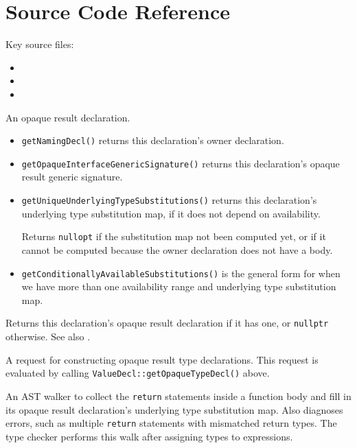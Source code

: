 \documentclass[../generics]{subfiles}
\begin{document}
\section{Source Code Reference}

Key source files:
\begin{itemize}
\item {}
\item {}
\item {}
\end{itemize}

An opaque result declaration.
\begin{itemize}
\item \texttt{getNamingDecl()} returns this declaration's owner declaration.
\item \texttt{getOpaqueInterfaceGenericSignature()} returns this declaration's opaque result generic signature.
\item \texttt{getUniqueUnderlyingTypeSubstitutions()} returns this declaration's underlying type substitution map, if it does not depend on availability.

Returns \texttt{nullopt} if the substitution map not been computed yet, or if it cannot be computed because the owner declaration does not have a body.
\item \texttt{getConditionallyAvailableSubstitutions()} is the general form for when we have more than one availability range and underlying type substitution map.
\end{itemize}

Returns this declaration's opaque result declaration if it has one, or \texttt{nullptr} otherwise.
See also .

A request for constructing opaque result type declarations. This request is evaluated by calling \texttt{ValueDecl::getOpaqueTypeDecl()} above.

An AST walker to collect the \texttt{return} statements inside a function body and fill in its opaque result declaration's underlying type substitution map. Also diagnoses errors, such as multiple \texttt{return} statements with mismatched return types. The type checker performs this walk after assigning types to expressions.
\end{document}
